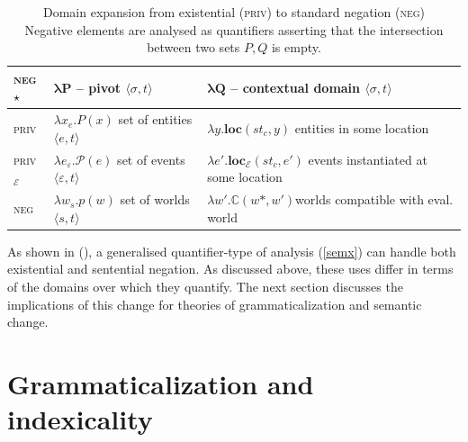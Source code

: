 \begin{table}[h]
	\caption{ Domain expansion from existential (\textsc{priv}) to standard negation (\textsc{neg})\\Negative elements are analysed as quantifiers asserting that the intersection between two sets $ P,Q $ is empty.}\centering
	\label{neg*domains}
	\begin{tabular}{m{.5in}m{1.5in}m{2.5in}}
		\multirow{1}{*}{\textsc{\textbf{neg}$ \star $}}&				$ \boldsymbol{\lambda P} $ -- {pivot} $ \langle\sigma,t \rangle$ & $ \boldsymbol{\lambda Q} $ -- contextual domain $\langle \sigma,t\rangle $\\\midrule\midrule
		\textsc{priv}&$ \lambda x_e.P(x) $	\newline
		set of entities $ \langle e,t\rangle $	& 
		$ \lambda y.\textbf{loc}(st_c,y) $\newline
		entities in some location\\\midrule
		\textsc{priv$ _{\mathcal E} $}&				$ \lambda e_\varepsilon.\mathcal P(e) $\newline
		set of events $ \langle\varepsilon,t\rangle  $& $ \lambda e'.\textbf{loc}_\mathcal E(st_c,e') $\newline
		events instantiated at some location\\\midrule
		\textsc{neg} & $ \lambda w_s.p(w) $	\newline
		set of worlds $ \langle s,t\rangle $&$ \lambda w'.\boldsymbol{\mathbb C}(w\!*,  w') $\newline worlds compatible with eval. world\\\bottomrule
	\end{tabular}\linebreak
\end{table}

\noindent As shown in (\lastx), a generalised quantifier-type of analysis (\ref{semx}) can handle both existential and sentential negation. As discussed above, these uses differ in terms of the domains over which they quantify. The next section discusses the implications of this change for theories of grammaticalization and semantic change.


\section{Grammaticalization and indexicality}

